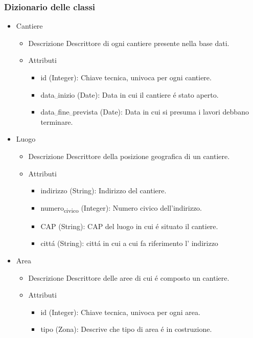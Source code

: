 \documentclass[11pt]{article}
\begin{document}
\subsubsection*{Dizionario delle classi}
\label{sec:orgd640895}
\begin{itemize}
\item Cantiere
\label{sec:org2f61ede}
\begin{itemize}
\item Descrizione
\label{sec:org789c80a}
Descrittore di ogni cantiere presente nella base dati.
\item Attributi
\label{sec:org9f531fb}
\begin{itemize}
\item id (Integer): Chiave tecnica, univoca per ogni cantiere.
\item data␣inizio (Date): Data in cui il cantiere é stato aperto.
\item data␣fine␣prevista (Date): Data in cui si presuma i lavori debbano terminare.
\end{itemize}
\end{itemize}
\item Luogo
\label{sec:org5e44189}
\begin{itemize}
\item Descrizione
\label{sec:orgc821d42}
Descrittore della posizione geografica di un cantiere.
\item Attributi
\label{sec:org2250cad}
\begin{itemize}
\item indirizzo (String): Indirizzo del cantiere.
\item numero\textsubscript{civico} (Integer): Numero civico dell'indirizzo.
\item CAP (String): CAP del luogo in cui é situato il cantiere.
\item cittá (String): cittá in cui a cui fa riferimento l' indirizzo
\end{itemize}
\end{itemize}
\item Area
\label{sec:org89d9577}
\begin{itemize}
\item Descrizione
\label{sec:org66a6e39}
Descrittore delle aree di cui é composto un cantiere.
\item Attributi
\label{sec:org896d389}
\begin{itemize}
\item id (Integer): Chiave tecnica, univoca per ogni area.
\item tipo (Zona): Descrive che tipo di area é in costruzione.

\end{itemize}
\end{itemize}
\end{itemize}
\end{document}

